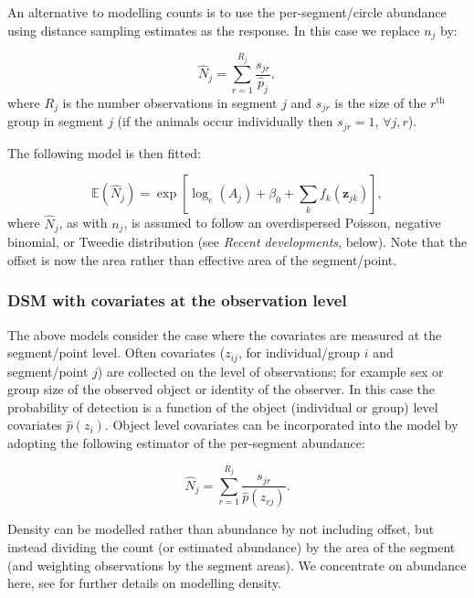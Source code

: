 \documentclass[a4paper,12pt]{article}
\begin{document}
An alternative to modelling counts is to use the per-segment/circle abundance using distance sampling estimates as the response. In this case we replace $n_j$ by:

\begin{equation*}
\hat{N}_j = \sum_{r=1}^{R_j} \frac{s_{jr}}{\hat{p}_j},
\end{equation*}
where $R_j$ is the number observations in segment $j$ and $s_{jr}$ is the size of the $r^\text{th}$ group in segment $j$ (if the animals occur individually then $s_{jr}=1$, $\forall j,r$). 

The following model is then fitted:

\begin{equation*}
\mathbb{E}(\hat{N}_j) = \exp\left[ \log_e \left( A_j \right) + \beta_0 + \sum_k f_k\left(\bm{z}_{jk}\right) \right],
\end{equation*}
where $\hat{N}_j$, as with $n_j$, is assumed to follow an overdispersed Poisson, negative binomial, or Tweedie distribution (see \textit{Recent developments}, below). Note that the offset is now the area rather than effective area of the segment/point.

\subsubsection*{DSM with covariates at the observation level}

The above models consider the case where the covariates are measured at the segment/point level. Often covariates ($z_{ij}$, for individual/group $i$ and segment/point $j$) are collected on the level of observations; for example sex or group size of the observed object or identity of the observer. In this case the probability of detection is a function of the object (individual or group) level covariates $\hat{p}(z_i)$. Object level covariates can be incorporated into the model by adopting the following estimator of the per-segment abundance:

\begin{equation*}
\hat{N}_j = \sum_{r=1}^{R_j} \frac{s_{jr}}{\hat{p}(z_{rj})}.
\end{equation*}

Density can be modelled rather than abundance by not including offset, but instead dividing the count (or estimated abundance) by the area of the segment (and weighting observations by the segment areas). We concentrate on abundance here, see \cite{Hedley:2004et} for further details on modelling density.
\end{document}
